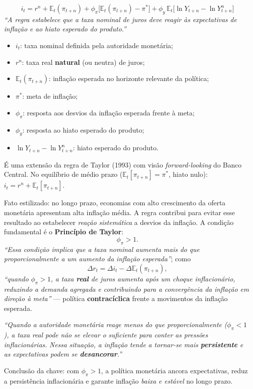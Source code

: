 \documentclass[12pt, a4paper]{article}
\newcommand{\E}{\mathbb{E}}
\begin{document}
\begin{correctbox}[title={Chave oficial (Q6-i): formulação e parâmetros}]
\[
i_t = r^n + \E_t(\pi_{t+n})
      + \phi_\pi\bigl[\E_t(\pi_{t+n}) - \pi^*\bigr]
      + \phi_y\,\E_t\bigl[\ln Y_{t+n} - \ln Y^n_{t+n}\bigr]
\]
\emph{``A regra estabelece que a taxa nominal de juros deve reagir às
expectativas de inflação e ao hiato esperado do produto.''}
\begin{itemize}[leftmargin=1.5em, itemsep=0.1em]
\item $i_t$: taxa nominal definida pela autoridade monetária;
\item $r^n$: taxa real \textbf{natural} (ou neutra) de juros;
\item $\E_t(\pi_{t+n})$: inflação esperada no horizonte relevante da política;
\item $\pi^*$: meta de inflação;
\item $\phi_\pi$: resposta aos desvios da inflação esperada frente à meta;
\item $\phi_y$: resposta ao hiato esperado do produto;
\item $\ln Y_{t+n} - \ln Y^n_{t+n}$: hiato esperado do produto.
\end{itemize}
É uma extensão da regra de Taylor (1993) com visão \emph{forward-looking} do
Banco Central. No equilíbrio de médio prazo ($\E_t[\pi_{t+n}]=\pi^*$, hiato
nulo): $i_t = r^n + \E_t[\pi_{t+n}]$.
\end{correctbox}

\begin{correctbox}[title={Chave oficial (Q6-ii): Princípio de Taylor e estabilidade da inflação}]
Fato estilizado: no longo prazo, economias com alto crescimento da oferta
monetária apresentam alta inflação média. A regra contribui para evitar esse
resultado ao estabelecer \emph{reação sistemática} a desvios da inflação. A
condição fundamental é o \textbf{Princípio de Taylor}:
\[
\phi_\pi > 1.
\]
\emph{``Essa condição implica que a taxa nominal aumenta mais do que
proporcionalmente a um aumento da inflação esperada''}; como
\[
\Delta r_t = \Delta i_t - \Delta \E_t(\pi_{t+n}),
\]
\emph{``quando $\phi_\pi > 1$, a taxa \textbf{real} de juros aumenta após um
choque inflacionário, reduzindo a demanda agregada e contribuindo para a
convergência da inflação em direção à meta''} --- política
\textbf{contracíclica} frente a movimentos da inflação esperada.

\emph{``Quando a autoridade monetária reage menos do que proporcionalmente
($\phi_\pi < 1$), a taxa real pode não se elevar o suficiente para conter as
pressões inflacionárias. Nessa situação, a inflação tende a tornar-se mais
\textbf{persistente} e as expectativas podem se \textbf{desancorar}.''}

Conclusão da chave: com $\phi_\pi > 1$, a política monetária ancora
expectativas, reduz a persistência inflacionária e garante inflação
\emph{baixa e estável} no longo prazo.
\end{correctbox}
\end{document}
